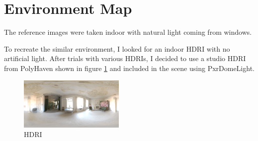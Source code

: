 \section{Environment Map}
The reference images were taken indoor with natural light coming from windows.

To recreate the similar environment, I looked for an indoor HDRI with no artificial light. After trials with various HDRIs, I decided to use a studio HDRI from PolyHaven \cite{polyhaven2022} shown in figure \ref{fig:hdri} and included in the scene using PxrDomeLight.

\begin{figure}[htpb]
  \includegraphics[width=0.45\textwidth]{imgs/photo_studio_london_hall_4k-min.png}
  \caption{HDRI \cite{polyhaven2022}}
  \label{fig:hdri}
\end{figure}